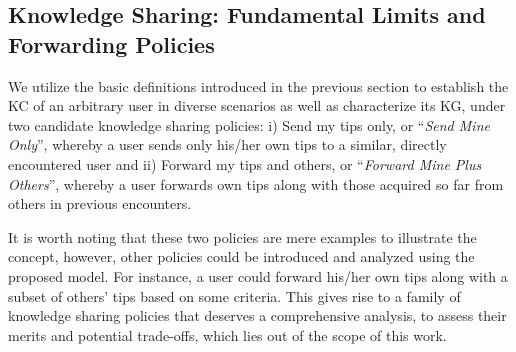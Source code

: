 \documentclass[conference]{IEEEtran}
\theoremstyle{definition}
\begin{document}
\subsection{Knowledge Sharing: Fundamental Limits and Forwarding Policies}
\vspace{-0.2 cm}
We utilize the basic definitions introduced in the previous section to establish the KC of an arbitrary user in diverse scenarios as well as characterize its KG, under two candidate knowledge sharing policies:
i) Send my tips only, or ``{\it Send Mine Only}'', whereby a user sends only his/her own 
tips to a similar, directly encountered user and ii) Forward my tips and others, or ``{\it Forward Mine Plus Others}'', whereby a user forwards own tips along with those acquired so far from others in previous encounters.

It is worth noting that these two policies are mere examples to illustrate the concept, however, other policies could be introduced and analyzed using the proposed model.
For instance, a user could forward his/her own tips along with a subset of others' tips based on some criteria. This gives rise to a family of knowledge sharing policies that deserves a comprehensive analysis, to assess their merits and potential trade-offs, which lies out of the scope of this work. 
%
\end{document}
